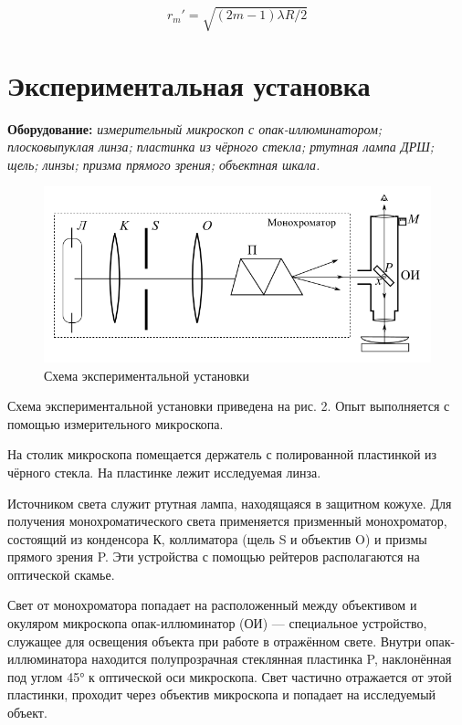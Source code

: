 \begin{equation}
    r_m' = \sqrt{(2m - 1)\lambda R/ 2}\label{eq:max_radius}
\end{equation}

\section*{Экспериментальная установка}
\textbf{Оборудование:} \textit{измерительный микроскоп с опак-иллюминатором; плосковыпуклая линза; пластинка из чёрного стекла;
ртутная лампа ДРШ; щель; линзы; призма прямого зрения; объектная шкала.}

\begin{figure}[h!]
    \centering
    \includegraphics[width=12cm]{images/setup.png}
    \caption{Схема экспериментальной установки}
\end{figure}

Схема экспериментальной установки приведена на рис. 2. Опыт выполняется с помощью измерительного микроскопа.

На столик микроскопа помещается держатель с полированной пластинкой из чёрного стекла. На пластинке лежит исследуемая линза.

Источником света служит ртутная лампа, находящаяся в защитном кожухе. Для получения монохроматического света применяется призменный монохроматор, состоящий из конденсора К, коллиматора (щель S и объектив O) и призмы прямого зрения P. Эти устройства с помощью рейтеров располагаются на оптической скамье.

Свет от монохроматора попадает на расположенный между объективом и окуляром микроскопа опак-иллюминатор (ОИ) — специальное устройство, служащее для освещения объекта при работе в отражённом свете. Внутри опак-иллюминатора находится полупрозрачная стеклянная пластинка P, наклонённая под углом 45° к оптической оси микроскопа. Свет частично отражается от этой пластинки, проходит через объектив микроскопа и попадает на исследуемый объект.

